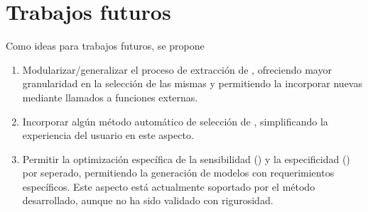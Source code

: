 %
%
%
\section{Trabajos futuros}
%
Como ideas para trabajos futuros, se propone
%
\begin{enumerate}
\item
  Modularizar/generalizar el proceso de extracción de ,
  ofreciendo mayor granularidad en la selección de las mismas y
  permitiendo la incorporar nuevas  mediante llamados a
  funciones externas.
\item
  Incorporar algún método automático de selección de ,
  simplificando la experiencia del usuario en este aspecto.
\item
  Permitir la optimización específica de la sensibilidad (\SE) y la
  especificidad (\SP) por seperado, permitiendo la generación de modelos
  con requerimientos específicos.
  Este aspecto está actualmente soportado por el método desarrollado,
  aunque no ha sido validado con rigurosidad.
\end{enumerate}
%
